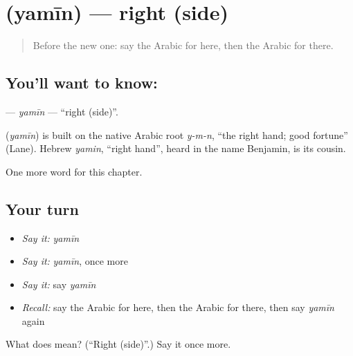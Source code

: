 \section[\texorpdfstring{\ar{يمين} (yamīn)}{يمين (yamīn)}]{ (yamīn) — right (side)}

\label{lesson:AR-C90-yamin}



\begin{quote}
Before the new one: say the Arabic for here, then the Arabic for there.
\end{quote}

\subsection*{You'll want to know: }
\textbf{} — \emph{yamīn} — \textquotedblleft{}right (side)\textquotedblright{}.

\begin{cousinweb}
\textbf{} (\emph{yamīn}) is built on the native Arabic root \emph{y-m-n}, \textquotedblleft{}the right hand; good fortune\textquotedblright{} (Lane). Hebrew \emph{yamin}, \textquotedblleft{}right hand\textquotedblright{}, heard in the name Benjamin, is its cousin.
\end{cousinweb}

\begin{grammarlens}[title={What you've built}]
One more word for this chapter.
\end{grammarlens}

\subsection*{Your turn}
\begin{itemize}
\raggedright
  \item \emph{Say it:} \emph{yamīn}
  \item \emph{Say it:} \emph{yamīn}, once more
  \item \emph{Say it:} say \emph{yamīn}
  \item \emph{Recall:} say the Arabic for here, then the Arabic for there, then say \emph{yamīn} again
\end{itemize}

\begin{tcolorbox}[breakable,colback=teal!4,colframe=teal!35!black,title={Before you move on}]
What does  mean? (\textquotedblleft{}Right (side)\textquotedblright{}.) Say it once more.
\end{tcolorbox}
